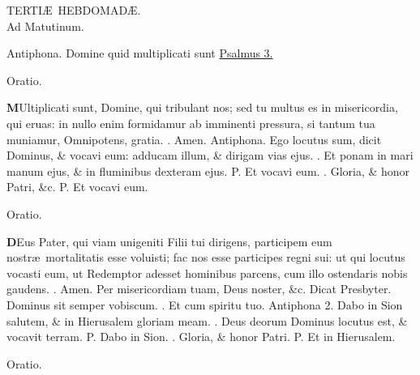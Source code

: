 \documentclass[letter,11pt]{book}
\makeatletter
\DeclareRobustCommand{\Vbar}{\vers@resp{-0.1em}{V}}
\DeclareRobustCommand{\Rbar}{\vers@resp{0pt}{R}}
\newcommand{\vers@resp@sym}{\raisebox{0.2ex}{\rotatebox[origin=c]{-20}{$\m@th\rceil$}}}
\newcommand{\vers@resp}[2]{%
  {\ooalign{\hidewidth\kern#1\vers@resp@sym\hidewidth\cr#2\cr}}%
}%
\def\P{\color{Red} P. \color{black}}
\def\V{\color{Red} \Vbar . \color{black}}
\def\R{\color{Red} \Rbar . \color{black}}
\makeatother
\begin{document}
\begin{multicols}{2}
\begin{center}
\color{black} TERTI\AE \ HEBDOMAD\AE .\\
\color{Red} Ad Matutinum.
\end{center} \vspace{-.5em}
\par \noindent \color{Red} Antiphona. \color{black} Domine quid multiplicati sunt \color{Red} \hyperlink{ps3}{Psalmus 3.} \color{black}
\vspace{-.5em} \begin{center} \color{Red} Oratio. \color{black} \end{center} \vspace{-.5em}
\lettrine[lines=2]{\bfseries \color{Red} M}{}Ultiplicati sunt, Domine, qui tribulant nos; sed tu multus es in misericordia, qui eruas: in nullo enim formidamur ab imminenti pressura, si tantum tua muniamur, Omnipotens, gratia. \R Amen.
\newline \color{Red} Antiphona. \color{black} Ego locutus sum, dicit Dominus, \& vocavi eum: adducam illum, \& dirigam vias ejus. \V Et ponam in mari manum ejus, \& in fluminibus dexteram ejus. \P Et vocavi eum. \V Gloria, \& honor Patri, \&c. \P Et vocavi eum.
\vspace{-.5em} \begin{center} \color{Red} Oratio. \color{black} \end{center} \vspace{-.5em}
\lettrine[lines=2]{\bfseries \color{Red} D}{}Eus Pater, qui viam unigeniti Filii tui dirigens, participem eum nostr\ae \ mortalitatis esse voluisti; fac nos esse participes regni sui: ut qui locutus vocasti eum, ut Redemptor adesset hominibus parcens, cum illo ostendaris nobis gaudens. \R Amen. Per misericordiam tuam, Deus noster, \&c.
\newline \color{Red} Dicat Presbyter. \color{black} Dominus sit semper vobiscum. \R Et cum spiritu tuo.
\newline \color{Red} Antiphona 2. \color{black} Dabo in Sion salutem, \& in Hierusalem gloriam meam. \V Deus deorum Dominus locutus est, \& vocavit terram. \P Dabo in Sion. \V Gloria, \& honor Patri. \P Et in Hierusalem.
\vspace{-.5em} \begin{center} \color{Red} Oratio. \color{black} \end{center} \vspace{-.5em}

\end{multicols}
\end{document}
